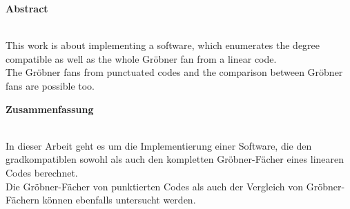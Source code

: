 

\begin{center}
\large \textbf{Abstract} \\
~\\ %
\end{center}
This work is about implementing a software, which enumerates the degree compatible as well as the whole Gröbner fan from a linear code. \\The Gröbner fans from punctuated codes and the comparison between Gröbner fans are possible too.

\vfill %
\begin{center}
\large \textbf{Zusammenfassung} \\
~\\ %
\end{center}
In dieser Arbeit geht es um die Implementierung einer Software, die den gradkompatiblen sowohl als auch den kompletten Gröbner-Fächer eines linearen Codes berechnet. \\Die Gröbner-Fächer von punktierten Codes als auch der Vergleich von Gröbner-Fächern können ebenfalls untersucht werden. 